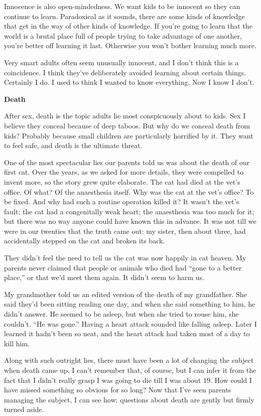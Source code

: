\documentclass[12pt]{book}
\begin{document}
Innocence is also open-mindedness. We want kids to be innocent so they
can continue to learn. Paradoxical as it sounds, there are some kinds of
knowledge that get in the way of other kinds of knowledge. If you're
going to learn that the world is a brutal place full of people trying to
take advantage of one another, you're better off learning it last.
Otherwise you won't bother learning much more.

Very smart adults often seem unusually innocent, and I don't think this
is a coincidence. I think they've deliberately avoided learning about
certain things. Certainly I do. I used to think I wanted to know
everything. Now I know I don't.

\textbf{Death}

After sex, death is the topic adults lie most conspicuously about to
kids. Sex I believe they conceal because of deep taboos. But why do we
conceal death from kids? Probably because small children are
particularly horrified by it. They want to feel safe, and death is the
ultimate threat.

One of the most spectacular lies our parents told us was about the death
of our first cat. Over the years, as we asked for more details, they
were compelled to invent more, so the story grew quite elaborate. The
cat had died at the vet's office. Of what? Of the anaesthesia itself.
Why was the cat at the vet's office? To be fixed. And why had such a
routine operation killed it? It wasn't the vet's fault; the cat had a
congenitally weak heart; the anaesthesia was too much for it; but there
was no way anyone could have known this in advance. It was not till we
were in our twenties that the truth came out: my sister, then about
three, had accidentally stepped on the cat and broken its back.

They didn't feel the need to tell us the cat was now happily in cat
heaven. My parents never claimed that people or animals who died had
``gone to a better place,'' or that we'd meet them again. It didn't seem
to harm us.

My grandmother told us an edited version of the death of my grandfather.
She said they'd been sitting reading one day, and when she said
something to him, he didn't answer. He seemed to be asleep, but when she
tried to rouse him, she couldn't. ``He was gone.'' Having a heart attack
sounded like falling asleep. Later I learned it hadn't been so neat, and
the heart attack had taken most of a day to kill him.

Along with such outright lies, there must have been a lot of changing
the subject when death came up. I can't remember that, of course, but I
can infer it from the fact that I didn't really grasp I was going to die
till I was about 19. How could I have missed something so obvious for so
long? Now that I've seen parents managing the subject, I can see how:
questions about death are gently but firmly turned aside.
\end{document}
